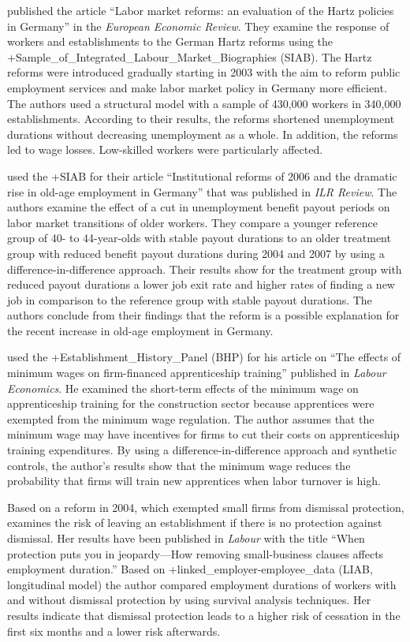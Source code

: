 \documentclass[
]{book}
\begin{document}
\citet{bradley2019} published the article ``Labor market reforms: an evaluation of the Hartz policies in Germany'' in the \emph{European Economic Review}. They examine the response of workers and establishments to the German Hartz reforms using the +Sample\_of\_Integrated\_Labour\_Market\_Biographies\textbar{} (SIAB). The Hartz reforms were introduced gradually starting in 2003 with the aim to reform public employment services and make labor market policy in Germany more efficient. The authors used a structural model with a sample of 430,000 workers in 340,000 establishments. According to their results, the reforms shortened unemployment durations without decreasing unemployment as a whole. In addition, the reforms led to wage losses. Low-skilled workers were particularly affected.

\citet{riphahn2019} used the +SIAB\textbar{} for their article ``Institutional reforms of 2006 and the dramatic rise in old-age employment in Germany'' that was published in \emph{ILR Review}. The authors examine the effect of a cut in unemployment benefit payout periods on labor market transitions of older workers. They compare a younger reference group of 40- to 44-year-olds with stable payout durations to an older treatment group with reduced benefit payout durations during 2004 and 2007 by using a difference-in-difference approach. Their results show for the treatment group with reduced payout durations a lower job exit rate and higher rates of finding a new job in comparison to the reference group with stable payout durations. The authors conclude from their findings that the reform is a possible explanation for the recent increase in old-age employment in Germany.

\citet{schumann2017} used the +Establishment\_History\_Panel\textbar{} (BHP) for his article on ``The effects of minimum wages on firm-financed apprenticeship training'' published in \emph{Labour Economics}. He examined the short-term effects of the minimum wage on apprenticeship training for the construction sector because apprentices were exempted from the minimum wage regulation. The author assumes that the minimum wage may have incentives for firms to cut their costs on apprenticeship training expenditures. By using a difference-in-difference approach and synthetic controls, the author's results show that the minimum wage reduces the probability that firms will train new apprentices when labor turnover is high.

Based on a reform in 2004, which exempted small firms from dismissal protection, \citep{lucke2018} examines the risk of leaving an establishment if there is no protection against dismissal. Her results have been published in \emph{Labour} with the title ``When protection puts you in jeopardy---How removing small-business clauses affects employment duration.'' Based on +linked\_employer-employee\_data\textbar{} (LIAB, longitudinal model) the author compared employment durations of workers with and without dismissal protection by using survival analysis techniques. Her results indicate that dismissal protection leads to a higher risk of cessation in the first six months and a lower risk afterwards.
\end{document}
